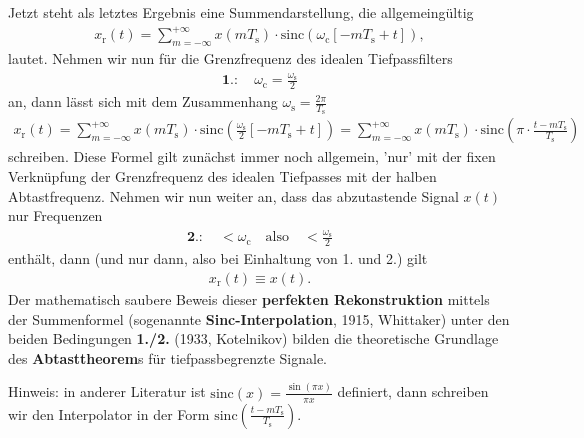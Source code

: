 \begin{mdframed}
Jetzt steht als letztes Ergebnis eine Summendarstellung, die allgemeingültig
\begin{align}
x_\mathrm{r}(t)
= \sum_{m=-\infty}^{+\infty} x(m T_\mathrm{s}) \cdot \mathrm{sinc}(\omega_\mathrm{c} [-m T_\mathrm{s} + t]),
\end{align}
lautet.
Nehmen wir nun für die Grenzfrequenz des idealen Tiefpassfilters
\begin{align}
\textbf{1.}:\quad\omega_\mathrm{c} = \frac{\omega_\mathrm{s}}{2}
\end{align}
an, dann lässt sich mit dem Zusammenhang
$\omega_\mathrm{s} = \frac{2\pi}{T_\mathrm{s}}$
\begin{align}
\label{eq:EF235EE3D8:ZeitSincInterpolation}
x_\mathrm{r}(t)=
\sum_{m=-\infty}^{+\infty} x(m T_\mathrm{s}) \cdot \mathrm{sinc}(\frac{\omega_\mathrm{s}}{2} [-m T_\mathrm{s} + t])=
\sum_{m=-\infty}^{+\infty} x(m T_\mathrm{s}) \cdot \mathrm{sinc}\left(\pi \cdot \frac{t-m T_\mathrm{s}}{T_\mathrm{s}}\right)
\end{align}
schreiben. Diese Formel gilt zunächst immer noch allgemein, 'nur' mit der
fixen Verknüpfung der Grenzfrequenz des idealen Tiefpasses mit der halben Abtastfrequenz.
Nehmen wir nun weiter an, dass das abzutastende Signal $x(t)$ nur Frequenzen
\begin{align}
\textbf{2.}:\quad<\omega_\mathrm{c}\quad\text{also}\quad<\frac{\omega_\mathrm{s}}{2}
\end{align}
enthält, dann (und nur dann, also bei Einhaltung von 1. und 2.) gilt
\begin{align}
x_\mathrm{r}(t) \equiv x(t).
\end{align}
Der mathematisch saubere Beweis dieser \textbf{perfekten Rekonstruktion}
mittels der Summenformel (sogenannte \textbf{Sinc-Interpolation}, 1915, Whittaker)
unter den beiden Bedingungen \textbf{1./2.} (1933, Kotelnikov) bilden die theoretische
Grundlage des \textbf{Abtasttheorem}s für tiefpassbegrenzte Signale.
%

Hinweis: in anderer Literatur ist $\mathrm{sinc}(x)=\frac{\sin(\pi x)}{\pi x}$ definiert,
dann schreiben wir den Interpolator in der Form
$\mathrm{sinc}\left(\frac{t-m T_\mathrm{s}}{T_\mathrm{s}}\right)$.
\end{mdframed}


